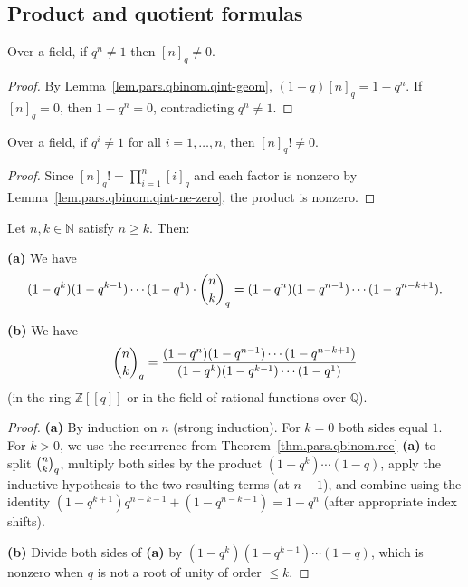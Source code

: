 \subsection{Product and quotient formulas}

\begin{lemma}
\label{lem.pars.qbinom.qint-ne-zero}
\leanhelper
\leanok
Over a field, if $q^n \neq 1$ then $[n]_q \neq 0$.
\end{lemma}

\begin{proof}
\leanok
By Lemma~\ref{lem.pars.qbinom.qint-geom}, $(1-q)[n]_q = 1 - q^n$.
If $[n]_q = 0$, then $1 - q^n = 0$, contradicting $q^n \neq 1$.
\end{proof}

\begin{lemma}
\label{lem.pars.qbinom.qfactorial-ne-zero}
\leanhelper
\leanok
Over a field, if $q^{i} \neq 1$ for all $i = 1, \ldots, n$, then $[n]_q! \neq 0$.
\end{lemma}

\begin{proof}
\leanok
Since $[n]_q! = \prod_{i=1}^{n} [i]_q$ and each factor is nonzero by
Lemma~\ref{lem.pars.qbinom.qint-ne-zero}, the product is nonzero.
\end{proof}

\begin{theorem}
\label{thm.pars.qbinom.quot1}
\leantarget
\leanok
Let $n,k\in\mathbb{N}$ satisfy $n\geq k$. Then:

\textbf{(a)} We have
\[
(1-q^{k})(1-q^{k-1})\cdots(1-q^{1})\cdot\dbinom{n}{k}_{q}
=(1-q^{n})(1-q^{n-1})\cdots(1-q^{n-k+1}).
\]

\textbf{(b)} We have
\[
\dbinom{n}{k}_{q}=\dfrac{(1-q^{n})(1-q^{n-1})
\cdots(1-q^{n-k+1})}{(1-q^{k})(1-q^{k-1})\cdots(1-q^{1})}
\]
(in the ring $\mathbb{Z}[[q]]$ or in the field
of rational functions over $\mathbb{Q}$).
\end{theorem}

\begin{proof}
\textbf{(a)} By induction on $n$ (strong induction). For $k = 0$ both sides
equal $1$. For $k > 0$, we use the recurrence from
Theorem~\ref{thm.pars.qbinom.rec} \textbf{(a)} to split $\dbinom{n}{k}_q$,
multiply both sides by the product $(1-q^k)\cdots(1-q)$, apply the inductive
hypothesis to the two resulting terms (at $n-1$), and combine using the
identity $(1-q^{k+1})q^{n-k-1} + (1-q^{n-k-1}) = 1-q^n$ (after appropriate
index shifts).

\textbf{(b)} Divide both sides of \textbf{(a)} by
$(1-q^k)(1-q^{k-1})\cdots(1-q)$, which is nonzero when $q$ is not a root
of unity of order $\leq k$.
\end{proof}

